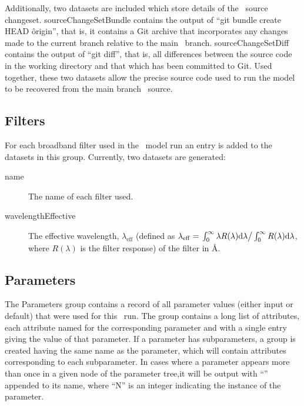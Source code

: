 Additionally, two datasets are included which store details of the \glc\ source changeset. {\normalfont \ttfamily sourceChangeSetBundle} contains the output of ``{\normalfont \ttfamily git bundle create HEAD \^origin}'', that is, it contains a Git archive that incorporates any changes made to the current branch relative to the main \glc\ branch. {\normalfont \ttfamily sourceChangeSetDiff} contains the output of ``{\normalfont \ttfamily git diff}'', that is, all differences between the source code in the working directory and that which has been committed to Git. Used together, these two datasets allow the precise source code used to run the model to be recovered from the main branch \glc\ source.

\subsection{Filters}

For each broadband filter used in the \glc\ model run an entry is added to the datasets in this group. Currently, two datasets are generated:
\begin{description}
\item[{\normalfont \ttfamily name}] The name of each filter used.
\item[{\normalfont \ttfamily wavelengthEffective}] The effective wavelength, $\lambda_\mathrm{eff}$ (defined as $\lambda_\mathrm{eff}=\left. \int_0^\infty \lambda R(\lambda) \mathrm{d}\lambda \right/ \int_0^\infty R(\lambda) \mathrm{d}\lambda$, where $R(\lambda)$ is the filter response) of the filter in \AA.
\end{description}

\subsection{Parameters}\label{sec:outputFile:parametersGroup}

The {\normalfont \ttfamily Parameters} group contains a record of all parameter values (either input or default) that were used for this \glc\ run. The group contains a long list of attributes, each attribute named for the corresponding parameter and with a single entry giving the value of that parameter. If a parameter has subparameters, a group is created having the same name as the parameter, which will contain attributes corresponding to each subparameter. In cases where a parameter appears more than once in a given node of the parameter tree,it will be output with ``{\normalfont \ttfamily [N]}'' appended to its name, where ``{\normalfont \ttfamily N}'' is an integer indicating the instance of the parameter.

